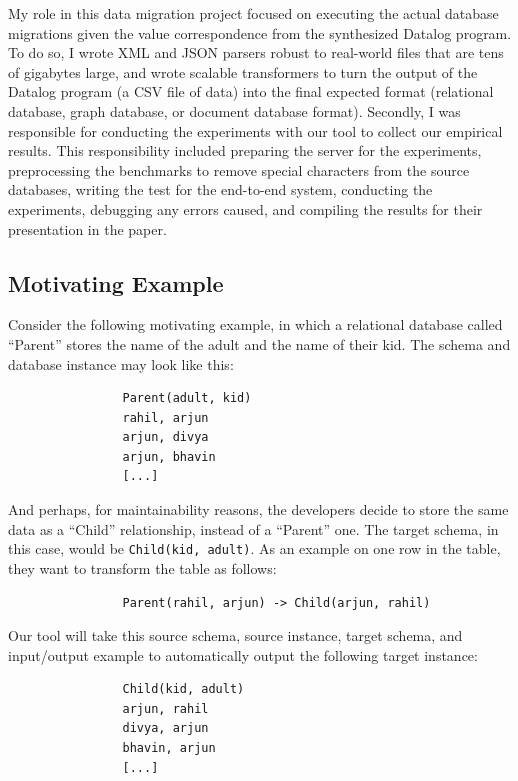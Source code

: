 \documentclass[]{article}
\begin{document}
            My role in this data migration project focused on executing the actual database migrations given the value correspondence from the synthesized Datalog program. To do so, I wrote XML and JSON parsers robust to real-world files that are tens of gigabytes large, and wrote scalable transformers to turn the output of the Datalog program (a CSV file of data) into the final expected format (relational database, graph database, or document database format). Secondly, I was responsible for conducting the experiments with our tool to collect our empirical results. This responsibility included preparing the server for the experiments, preprocessing the benchmarks to remove special characters from the source databases, writing the test for the end-to-end system, conducting the experiments, debugging any errors caused, and compiling the results for their presentation in the paper. 

        \subsection{Motivating Example}

            Consider the following motivating example, in which a relational database called ``Parent'' stores the name of the adult and the name of their kid. The schema and database instance may look like this:

            \begin{verbatim}
                Parent(adult, kid)
                rahil, arjun
                arjun, divya
                arjun, bhavin
                [...]
            \end{verbatim}

            And perhaps, for maintainability reasons, the developers decide to store the same data as a ``Child'' relationship, instead of a ``Parent'' one. The target schema, in this case, would be \texttt{Child(kid, adult)}. As an example on one row in the table, they want to transform the table as follows:

            \begin{verbatim}
                Parent(rahil, arjun) -> Child(arjun, rahil)
            \end{verbatim}

            Our tool will take this source schema, source instance, target schema, and input/output example to automatically output the following target instance:

            \begin{verbatim}
                Child(kid, adult)
                arjun, rahil
                divya, arjun
                bhavin, arjun
                [...]
            \end{verbatim}
\end{document}
